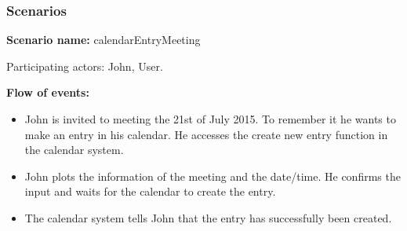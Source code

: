 \subsubsection{Scenarios}
\textbf{Scenario name:} calendarEntryMeeting

Participating actors: John, User.

\textbf{Flow of events:}
\begin{itemize}
\item John is invited to meeting the 21st of July 2015. To remember it he wants to make an entry in his calendar. He accesses the create new entry function in the calendar system.
\item John plots the information of the meeting and the date/time. He confirms the input and waits for the calendar to create the entry.
\item The calendar system tells John that the entry has successfully been created.
\end{itemize}